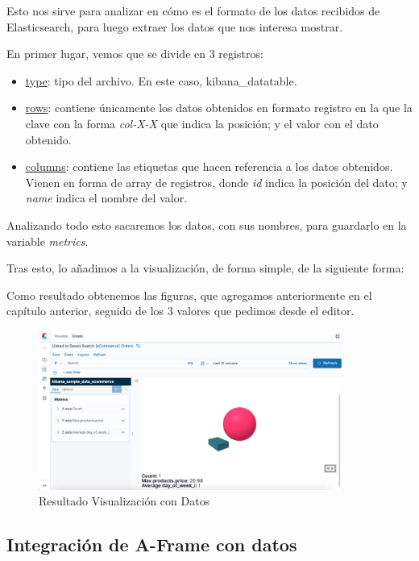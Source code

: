 \documentclass[a4paper, 12pt]{book}
\begin{document}
Esto nos sirve para analizar en cómo es el formato de los datos recibidos de Elasticsearch, para luego extraer los datos que nos interesa mostrar. 

En primer lugar, vemos que se divide en 3 registros: 
\begin{itemize}
    \item \underline{type}: tipo del archivo. En este caso, kibana\_datatable.
    \item \underline{rows}: contiene únicamente los datos obtenidos en formato registro en la que la clave con la forma \textit{col-X-X} que indica la posición; y el valor con el dato obtenido.
    \item \underline{columns}: contiene las etiquetas que hacen referencia a los datos obtenidos. Vienen en forma de array de registros, donde \textit{id} indica la posición del dato; y \textit{name} indica el nombre del valor. 
\end{itemize}

Analizando todo esto sacaremos los datos, con sus nombres, para guardarlo en la variable \textit{metrics}.



Tras esto, lo añadimos a la visualización, de forma simple, de la siguiente forma:





Como resultado obtenemos las figuras, que agregamos anteriormente en el capítulo anterior, seguido de los 3 valores que pedimos desde el editor.

\begin{figure}[H]
  \centering
  \includegraphics[width=10cm, keepaspectratio]{img/development/resultado-simple-data.png}
  \caption{Resultado Visualización con Datos}
  \label{fig:simplewithdata}
\end{figure}


\subsection{Integración de A-Frame con datos}
\label{sec:aframecondatos}
\end{document}
